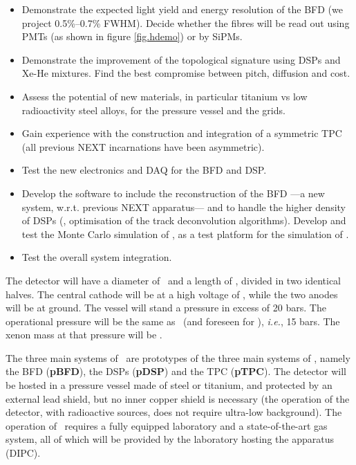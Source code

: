 \begin{itemize}[noitemsep,topsep=0pt,parsep=0pt,partopsep=0pt]
\item Demonstrate the expected light yield and energy resolution of the BFD (we project 0.5\%--0.7\% FWHM). Decide whether the fibres will be read out using PMTs (as shown in figure \ref{fig.hdemo}) or by SiPMs. 
\item Demonstrate the improvement of the topological signature using DSPs and Xe-He mixtures. Find the best compromise between pitch, diffusion and cost. 
\item Assess the potential of new materials, in particular titanium vs low radioactivity steel alloys, for the pressure vessel and the grids. 
\item Gain experience with the construction and integration of a symmetric TPC (all previous NEXT incarnations have been asymmetric). 
\item Test the new electronics and DAQ for the BFD and DSP.
\item Develop the software to include the reconstruction of the BFD ---a new system, w.r.t. previous NEXT apparatus--- and to handle the higher density of DSPs (\eg, optimisation of the track deconvolution algorithms). Develop and test the Monte Carlo simulation of \HDEMO, as a test platform for the simulation of \NHD. 
\item Test the overall system integration. 
\end{itemize}

\indent


The detector will have a diameter of \HDD\ and a length of \HDL, divided in two identical halves. The central cathode will be at a high voltage of \HDHV, while the two anodes will be at ground. The vessel will stand a pressure in excess of 20 bars. The operational pressure will be the same as \Next\ (and foreseen for \NHD), \emph{i.e.}, 15 bars. The xenon mass at that pressure will be \HDM. 

\indent


The three main systems of \HDEMO\ are  prototypes of the three main systems of \NHD, namely the BFD ({\bf pBFD}), the DSPs ({\bf pDSP}) and  the TPC ({\bf pTPC}). The detector will be hosted in a pressure vessel made of steel or titanium, and protected by an external lead shield, but no inner copper shield is necessary (the operation of the detector, with radioactive sources, does not require ultra-low background). The operation of \HDEMO\ requires a fully equipped laboratory and a state-of-the-art gas system, all of which will be provided by the laboratory hosting the apparatus (DIPC). 

